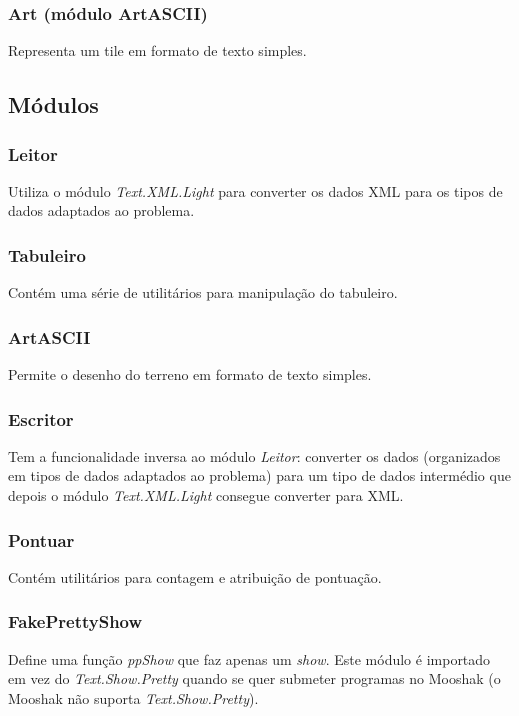 \documentclass[11pt, a4paper, twoside]{article}
\begin{document}
\subsubsection[Art]{Art (módulo ArtASCII)}

\begin{description}[style=multiline,leftmargin=2cm,font=\bfseries]
    \item[[String{]}] Representa um tile em formato de texto simples.
\end{description}

\newpage
\subsection{Módulos}

\subsubsection{Leitor}
Utiliza o módulo \emph{Text.XML.Light} para converter os dados XML para os tipos de dados adaptados ao problema.

\subsubsection{Tabuleiro}
Contém uma série de utilitários para manipulação do tabuleiro.

\subsubsection{ArtASCII}
Permite o desenho do terreno em formato de texto simples.

\subsubsection{Escritor}
Tem a funcionalidade inversa ao módulo \emph{Leitor}: converter os dados (organizados em tipos de dados adaptados ao problema) para um tipo de dados intermédio que depois o módulo \emph{Text.XML.Light} consegue converter para XML.

\subsubsection{Pontuar}
Contém utilitários para contagem e atribuição de pontuação.

\subsubsection{FakePrettyShow}
Define uma função \emph{ppShow} que faz apenas um \emph{show}. Este módulo é importado em vez do \emph{Text.Show.Pretty} quando se quer submeter programas no Mooshak (o Mooshak não suporta \emph{Text.Show.Pretty}).
\end{document}
